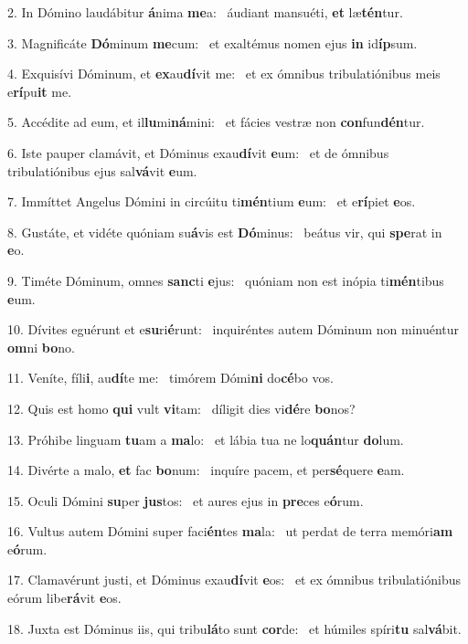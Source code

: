 2. In Dómino laudábitur \textbf{á}nima \textbf{me}a: \ast\  áudiant mansuéti, \textbf{et} læ\textbf{tén}tur.\

3. Magnificáte \textbf{Dó}minum \textbf{me}cum: \ast\  et exaltémus nomen ejus \textbf{in} id\textbf{íp}sum.\

4. Exquisívi Dóminum, et \textbf{ex}au\textbf{dí}vit me: \ast\  et ex ómnibus tribulatiónibus meis e\textbf{rí}pu\textbf{it} me.\

5. Accédite ad eum, et il\textbf{lu}mi\textbf{ná}mini: \ast\  et fácies vestræ non \textbf{con}fun\textbf{dén}tur.\

6. Iste pauper clamávit, et Dóminus exau\textbf{dí}vit \textbf{e}um: \ast\  et de ómnibus tribulatiónibus ejus sal\textbf{vá}vit \textbf{e}um.\

7. Immíttet Angelus Dómini in circúitu ti\textbf{mén}tium \textbf{e}um: \ast\  et e\textbf{rí}piet \textbf{e}os.\

8. Gustáte, et vidéte quóniam su\textbf{á}vis est \textbf{Dó}minus: \ast\  beátus vir, qui \textbf{spe}rat in \textbf{e}o.\

9. Timéte Dóminum, omnes \textbf{sanc}ti \textbf{e}jus: \ast\  quóniam non est inópia ti\textbf{mén}tibus \textbf{e}um.\

10. Dívites eguérunt et e\textbf{su}ri\textbf{é}runt: \ast\  inquiréntes autem Dóminum non minuéntur \textbf{om}ni \textbf{bo}no.\

11. Veníte, fíli\textbf{i}, au\textbf{dí}te me: \ast\  timórem Dómi\textbf{ni} do\textbf{cé}bo vos.\

12. Quis est homo \textbf{qui} vult \textbf{vi}tam: \ast\  díligit dies vi\textbf{dé}re \textbf{bo}nos?\

13. Próhibe linguam \textbf{tu}am a \textbf{ma}lo: \ast\  et lábia tua ne lo\textbf{quán}tur \textbf{do}lum.\

14. Divérte a malo, \textbf{et} fac \textbf{bo}num: \ast\  inquíre pacem, et per\textbf{sé}quere \textbf{e}am.\

15. Oculi Dómini \textbf{su}per \textbf{jus}tos: \ast\  et aures ejus in \textbf{pre}ces e\textbf{ó}rum.\

16. Vultus autem Dómini super faci\textbf{én}tes \textbf{ma}la: \ast\  ut perdat de terra memóri\textbf{am} e\textbf{ó}rum.\

17. Clamavérunt justi, et Dóminus exau\textbf{dí}vit \textbf{e}os: \ast\  et ex ómnibus tribulatiónibus eórum libe\textbf{rá}vit \textbf{e}os.\

18. Juxta est Dóminus iis, qui tribu\textbf{lá}to sunt \textbf{cor}de: \ast\  et húmiles spíri\textbf{tu} sal\textbf{vá}bit.\

